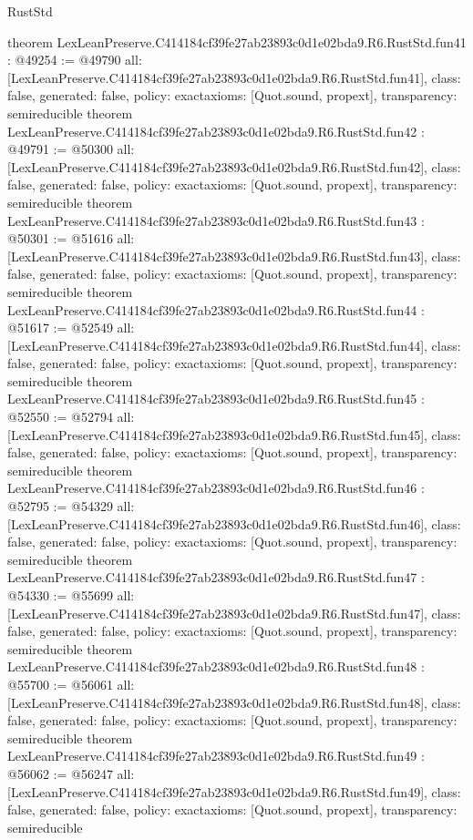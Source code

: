 \begin{lexlean}{RustStd}
\begin{coremodule}
{}
theorem LexLeanPreserve.C414184cf39fe27ab23893c0d1e02bda9.R6.RustStd.fun41 : @49254 := @49790 {
  all: [LexLeanPreserve.C414184cf39fe27ab23893c0d1e02bda9.R6.RustStd.fun41],
  class: false,
  generated: false,
  policy: exact{axioms: [Quot.sound, propext]},
  transparency: semireducible
}
theorem LexLeanPreserve.C414184cf39fe27ab23893c0d1e02bda9.R6.RustStd.fun42 : @49791 := @50300 {
  all: [LexLeanPreserve.C414184cf39fe27ab23893c0d1e02bda9.R6.RustStd.fun42],
  class: false,
  generated: false,
  policy: exact{axioms: [Quot.sound, propext]},
  transparency: semireducible
}
theorem LexLeanPreserve.C414184cf39fe27ab23893c0d1e02bda9.R6.RustStd.fun43 : @50301 := @51616 {
  all: [LexLeanPreserve.C414184cf39fe27ab23893c0d1e02bda9.R6.RustStd.fun43],
  class: false,
  generated: false,
  policy: exact{axioms: [Quot.sound, propext]},
  transparency: semireducible
}
theorem LexLeanPreserve.C414184cf39fe27ab23893c0d1e02bda9.R6.RustStd.fun44 : @51617 := @52549 {
  all: [LexLeanPreserve.C414184cf39fe27ab23893c0d1e02bda9.R6.RustStd.fun44],
  class: false,
  generated: false,
  policy: exact{axioms: [Quot.sound, propext]},
  transparency: semireducible
}
theorem LexLeanPreserve.C414184cf39fe27ab23893c0d1e02bda9.R6.RustStd.fun45 : @52550 := @52794 {
  all: [LexLeanPreserve.C414184cf39fe27ab23893c0d1e02bda9.R6.RustStd.fun45],
  class: false,
  generated: false,
  policy: exact{axioms: [Quot.sound, propext]},
  transparency: semireducible
}
theorem LexLeanPreserve.C414184cf39fe27ab23893c0d1e02bda9.R6.RustStd.fun46 : @52795 := @54329 {
  all: [LexLeanPreserve.C414184cf39fe27ab23893c0d1e02bda9.R6.RustStd.fun46],
  class: false,
  generated: false,
  policy: exact{axioms: [Quot.sound, propext]},
  transparency: semireducible
}
theorem LexLeanPreserve.C414184cf39fe27ab23893c0d1e02bda9.R6.RustStd.fun47 : @54330 := @55699 {
  all: [LexLeanPreserve.C414184cf39fe27ab23893c0d1e02bda9.R6.RustStd.fun47],
  class: false,
  generated: false,
  policy: exact{axioms: [Quot.sound, propext]},
  transparency: semireducible
}
theorem LexLeanPreserve.C414184cf39fe27ab23893c0d1e02bda9.R6.RustStd.fun48 : @55700 := @56061 {
  all: [LexLeanPreserve.C414184cf39fe27ab23893c0d1e02bda9.R6.RustStd.fun48],
  class: false,
  generated: false,
  policy: exact{axioms: [Quot.sound, propext]},
  transparency: semireducible
}
theorem LexLeanPreserve.C414184cf39fe27ab23893c0d1e02bda9.R6.RustStd.fun49 : @56062 := @56247 {
  all: [LexLeanPreserve.C414184cf39fe27ab23893c0d1e02bda9.R6.RustStd.fun49],
  class: false,
  generated: false,
  policy: exact{axioms: [Quot.sound, propext]},
  transparency: semireducible
}
\end{coremodule}
\end{lexlean}
